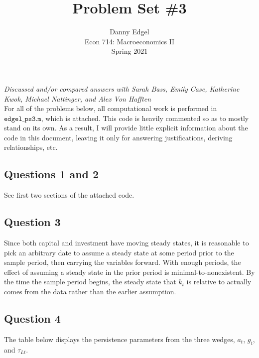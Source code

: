 \documentclass{article}
\begin{document}
\title{	Problem Set \#3 }
\author{ 	Danny Edgel 					\\ 
			Econ 714: Macroeconomics II		\\
			Spring 2021						\\
		}
\maketitle\thispagestyle{empty}


\noindent\textit{Discussed and/or compared answers with Sarah Bass, Emily Case, Katherine Kwok, Michael Nattinger, and Alex Von Hafften}
\bigskip \\
\noindent For all of the problems below, all computational work is performed in $\texttt{edgel\_ps3.m}$, which is attached. This code is heavily commented so as to mostly stand on its own. As a result, I will provide little explicit information about the code in this document, leaving it only for answering justifications, deriving relationships, etc.


\subsection*{Questions 1 and 2}
See first two sections of the attached code.



\subsection*{Question 3}
Since both capital and investment have moving steady states, it is reasonable to pick an arbitrary date to assume a steady state at some period prior to the sample period, then carrying the variables forward. With enough periods, the effect of assuming a steady state in the prior period is minimal-to-nonexistent. By the time the sample period begins, the steady state that $k_t$ is relative to actually comes from the data rather than the earlier assumption.



\subsection*{Question 4}
The table below displays the persistence parameters from the three wedges, $a_t$, $g_t$, and $\tau_{Lt}$.
\begin{center}  \end{center}
\end{document}
